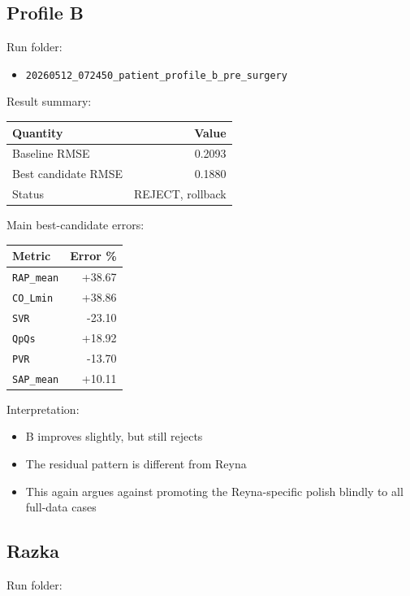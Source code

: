 \documentclass[11pt,a4paper]{article}
\begin{document}
\subsection{Profile B}

Run folder:

\begin{itemize}[leftmargin=1.5em]
    \item \texttt{20260512\_072450\_patient\_profile\_b\_pre\_surgery}
\end{itemize}

Result summary:

\begin{tabular}{lr}
\toprule
Quantity & Value \\
\midrule
Baseline RMSE & 0.2093 \\
Best candidate RMSE & 0.1880 \\
Status & REJECT, rollback \\
\bottomrule
\end{tabular}

Main best-candidate errors:

\begin{tabular}{lr}
\toprule
Metric & Error \% \\
\midrule
\texttt{RAP\_mean} & +38.67 \\
\texttt{CO\_Lmin} & +38.86 \\
\texttt{SVR} & -23.10 \\
\texttt{QpQs} & +18.92 \\
\texttt{PVR} & -13.70 \\
\texttt{SAP\_mean} & +10.11 \\
\bottomrule
\end{tabular}

Interpretation:

\begin{itemize}[leftmargin=1.5em]
    \item B improves slightly, but still rejects
    \item The residual pattern is different from Reyna
    \item This again argues against promoting the Reyna-specific polish blindly
    to all full-data cases
\end{itemize}

\subsection{Razka}

Run folder:
\end{document}

